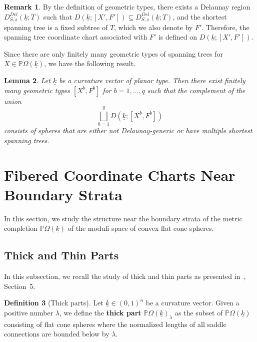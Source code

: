 \documentclass{compositio}
\numberwithin{equation}{section}
\numberwithin{figure}{section}
\theoremstyle{definition}
\newtheorem{definition}{Definition}[section]
\newtheorem{remark}[definition]{Remark}
\theoremstyle{plain}
\newtheorem{lemma}[definition]{Lemma}
\begin{document}
{\begin{remark}\label{rmk:chartonregionofgeometrictype}
By the definition of geometric types, there exists a Delaunay region $D_{S,\underline{s}}^{Del}(\underline{k};T)$ such that $D(\underline{k};[X',F']) \subseteq D_{S,\underline{s}}^{Del}(\underline{k};T)$, and the shortest spanning tree is a fixed subtree of $T$, which we also denote by $F'$. Therefore, the spanning tree coordinate chart associated with $F'$ is defined on $D(\underline{k};[X',F'])$.
\end{remark}

Since there are only finitely many geometric types of spanning trees for $X\in \mathbb{P}\Omega(\underline{k})$, we have the following result.

\begin{lemma}\label{lem:decompinfinitecase}
Let $\underline{k}$ be a curvature vector of planar type. Then there exist finitely many geometric types $[X^b, F^b]$ for $b = 1, \dots, q$ such that the complement of the union
$$
\bigsqcup_{b=1}^q D(\underline{k};[X^b, F^b])
$$
consists of spheres that are either not Delaunay-generic or have multiple shortest spanning trees.
\end{lemma}


\section{Fibered Coordinate Charts Near Boundary Strata}\label{bigsec:coor}

In this section, we study the structure near the boundary strata of the metric completion $\overline{\mathbb{P}\Omega}(\underline{k})$ of the moduli space of convex flat cone spheres.

\subsection{Thick and Thin Parts}
In this subsection, we recall the study of thick and thin parts as presented in~\cite{fu2024uniformlengthestimatestrajectories}, Section~5.

\begin{definition}[Thick parts]
Let $\underline{k}\in(0,1)^n$ be a curvature vector. Given a positive number $\lambda$, we define the \textbf{thick part} $\mathbb{P}\Omega(\underline{k})_{\lambda}$ as the subset of $\mathbb{P}\Omega(\underline{k})$ consisting of flat cone spheres where the normalized lengths of all saddle connections are bounded below by $\lambda$.
\end{definition}

}
\end{document}
